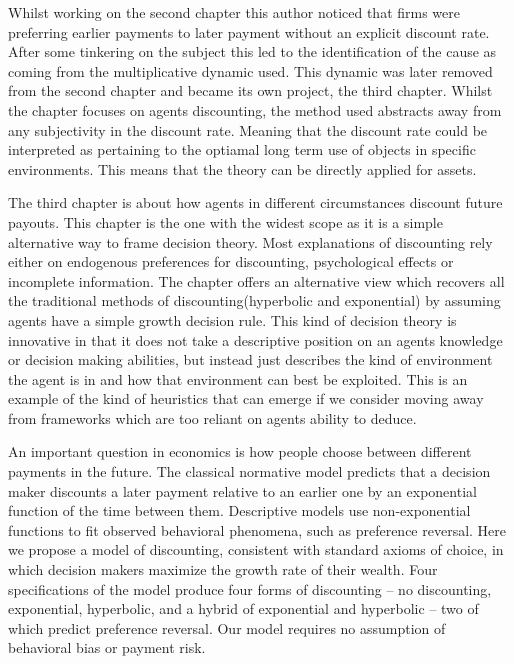 Whilst working on the second chapter this author noticed that firms were preferring earlier payments to later payment without an explicit discount rate. After some tinkering on the subject this led to the identification of the cause as coming from the multiplicative dynamic used. This dynamic was later removed from the second chapter and became its own project, the third chapter. Whilst the chapter focuses on agents discounting, the method used abstracts away from any subjectivity in the discount rate. Meaning that the discount rate could be interpreted as pertaining to the optiamal long term use of objects in specific environments. This means that the theory can be directly applied for assets.  

The third chapter is about how agents in different circumstances discount future payouts. This chapter is the one with the widest scope as it is a simple alternative way to frame decision theory. Most explanations of discounting rely either on endogenous preferences for discounting, psychological effects or incomplete information. The chapter offers an alternative view which recovers all the traditional methods of discounting(hyperbolic and exponential) by assuming agents have a simple growth decision rule. This kind of decision theory is innovative in that it does not take a descriptive position on an agents knowledge or decision making abilities, but instead just describes the kind of environment the agent is in and how that environment can best be exploited. This is an example of the kind of heuristics that can emerge if we consider moving away from frameworks which are too reliant on agents ability to deduce.

An important question in economics is how people choose between different payments in the future. The classical normative model predicts that a decision maker discounts a later payment relative to an earlier one by an exponential function of the time between them. Descriptive models use non-exponential functions to fit observed behavioral phenomena, such as preference reversal. Here we propose a model of discounting, consistent with standard axioms of choice, in which decision makers maximize the growth rate of their wealth. Four specifications of the model produce four forms of discounting -- no discounting, exponential, hyperbolic, and a hybrid of exponential and hyperbolic -- two of which predict preference reversal. Our model requires no assumption of behavioral bias or payment risk.



